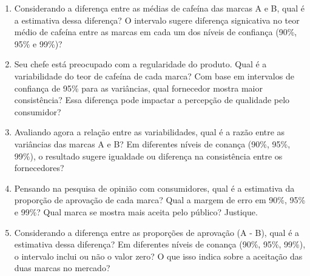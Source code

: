 \documentclass[11pt]{article}
\begin{document}
\begin{enumerate}
    \item Considerando a diferença entre as médias de cafeína das marcas A e B,
    qual é a estimativa dessa diferença? O intervalo sugere diferença
    signicativa no teor médio de cafeína entre as marcas em cada um dos níveis
    de confiança (90\%, 95\% e 99\%)?
    \item Seu chefe está preocupado com a regularidade do produto. Qual é a
    variabilidade do teor de cafeína de cada marca? Com base em intervalos de
    confiança de 95\% para as variâncias, qual fornecedor mostra maior
    consistência? Essa diferença pode impactar a percepção de qualidade pelo
    consumidor?
    \item Avaliando agora a relação entre as variabilidades, qual é a razão
    entre as variâncias das marcas A e B? Em diferentes níveis de conança (90\%,
    95\%, 99\%), o resultado sugere igualdade ou diferença na consistência entre
    os fornecedores?
    \item Pensando na pesquisa de opinião com consumidores, qual é a estimativa
    da proporção de aprovação de cada marca? Qual a margem de erro em 90\%, 95\%
    e 99\%? Qual marca se mostra mais aceita pelo público? Justique.
    \item Considerando a diferença entre as proporções de aprovação (A - B),
    qual é a estimativa dessa diferença? Em diferentes níveis de conança (90\%,
    95\%, 99\%), o intervalo inclui ou não o valor zero? O que isso indica sobre
    a aceitação das duas marcas no mercado?
\end{enumerate}
\end{document}
